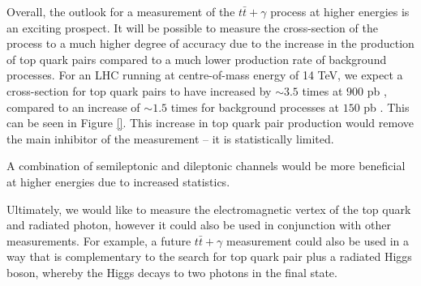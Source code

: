 Overall, the outlook for a measurement of the $t\bar{t}+\gamma$ process at higher energies is an exciting prospect. It will be possible to measure the cross-section of the process to a much higher degree of accuracy due to the increase in the production of top quark pairs compared to a much lower production rate of background processes. For an LHC running at centre-of-mass energy of 14 TeV, we expect a cross-section for top quark pairs to have increased by $\sim3.5$ times at $900$ pb \cite{}, compared to an increase of $\sim1.5$ times for background processes at $150$ pb \cite{}. This can be seen in Figure \ref{}. This increase in top quark pair production would remove the main inhibitor of the measurement -- it is statistically limited.

A combination of semileptonic and dileptonic channels would be more beneficial at higher energies due to increased statistics. 

Ultimately, we would like to measure the electromagnetic vertex of the top quark and radiated photon, however it could also be used in conjunction with other measurements. For example, a future $t\bar{t}+\gamma$ measurement could also be used in a way that is complementary to the search for top quark pair plus a radiated Higgs boson, whereby the Higgs decays to two photons in the final state.


